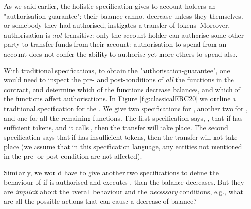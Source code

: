  

As we said earlier,  the holistic specification gives to account holders an
 "authorisation-guarantee": their balance cannot decrease unless they
 themselves, or somebody they had authorised, instigates a transfer of
 tokens. Moreover, authorisation is {\em not} transitive: only the
 account holder can authorise some other party to transfer funds from
 their account: authorisation to spend from an account does not confer
 the ability to authorise yet more others to spend also.
 
 With traditional  specifications, to obtain the "authorisation-guarantee", 
one would need to inspect the pre- and post-conditions of {\em all} the functions
in the contract, and determine which of the functions decrease balances, and which of the functions 
 affect authorisations.
In Figure \ref{fig:classicalERC20} we outline a traditional specification for the .
We give two specifications for , another two for , and one for all 
the remaining functions. The  first specification says, \eg, that if  
  has sufficient tokens, and it calls , then the transfer will take place.  
The second specification says that  if  has insufficient tokens, then 
the transfer will not take place (we assume that in this
specification language, any entities not mentioned in the pre- or post-condition 
are not affected).
 
 Similarly, we would have to give another two specifications to define the behaviour of 
if  is authorised and executes , then   the balance decreases. 
But they are {\em implicit} about the overall behaviour and the   {\em necessary} conditions,
e.g., what are all the possible actions that can cause a decrease of balance?


